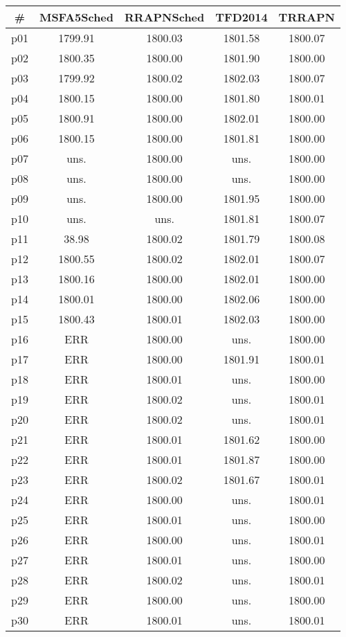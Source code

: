 \begin{tabular}{ccccc}
\toprule
\textbf{\#} & \textbf{MSFA5Sched} & \textbf{RRAPNSched} & \textbf{TFD2014} & \textbf{TRRAPN}\\
\midrule
p01 & 1799.91 & 1800.03 & 1801.58 & 1800.07\\
p02 & 1800.35 & 1800.00 & 1801.90 & 1800.00\\
p03 & 1799.92 & 1800.02 & 1802.03 & 1800.07\\
p04 & 1800.15 & 1800.00 & 1801.80 & 1800.01\\
p05 & 1800.91 & 1800.00 & 1802.01 & 1800.00\\
p06 & 1800.15 & 1800.00 & 1801.81 & 1800.00\\
p07 & uns. & 1800.00 & uns. & 1800.00\\
p08 & uns. & 1800.00 & uns. & 1800.00\\
p09 & uns. & 1800.00 & 1801.95 & 1800.00\\
p10 & uns. & uns. & 1801.81 & 1800.07\\
p11 & 38.98 & 1800.02 & 1801.79 & 1800.08\\
p12 & 1800.55 & 1800.02 & 1802.01 & 1800.07\\
p13 & 1800.16 & 1800.00 & 1802.01 & 1800.00\\
p14 & 1800.01 & 1800.00 & 1802.06 & 1800.00\\
p15 & 1800.43 & 1800.01 & 1802.03 & 1800.00\\
p16 & ERR & 1800.00 & uns. & 1800.00\\
p17 & ERR & 1800.00 & 1801.91 & 1800.01\\
p18 & ERR & 1800.01 & uns. & 1800.00\\
p19 & ERR & 1800.02 & uns. & 1800.01\\
p20 & ERR & 1800.02 & uns. & 1800.01\\
p21 & ERR & 1800.01 & 1801.62 & 1800.00\\
p22 & ERR & 1800.01 & 1801.87 & 1800.00\\
p23 & ERR & 1800.02 & 1801.67 & 1800.01\\
p24 & ERR & 1800.00 & uns. & 1800.01\\
p25 & ERR & 1800.01 & uns. & 1800.00\\
p26 & ERR & 1800.00 & uns. & 1800.01\\
p27 & ERR & 1800.01 & uns. & 1800.00\\
p28 & ERR & 1800.02 & uns. & 1800.01\\
p29 & ERR & 1800.00 & uns. & 1800.00\\
p30 & ERR & 1800.01 & uns. & 1800.01\\
\bottomrule
\end{tabular}

